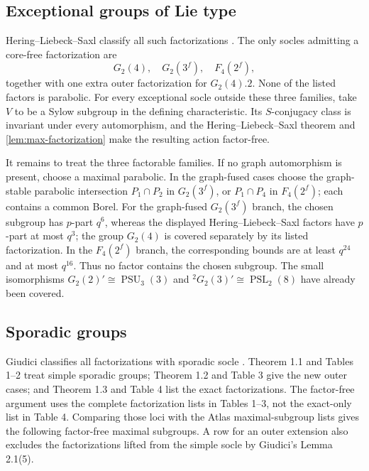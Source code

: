 \documentclass[11pt]{amsart}
\newcommand{\PSL}{\operatorname{PSL}}
\newcommand{\PSU}{\operatorname{PSU}}
\theoremstyle{definition}
\begin{document}
\subsection{Exceptional groups of Lie type}\label{app:exceptional}

Hering--Liebeck--Saxl classify all such factorizations
\cite[Theorems 1--2]{hls-exceptional}.
The only socles admitting a core-free factorization are
\[
G_2(4),\quad G_2(3^f),\quad F_4(2^f),
\]
together with one extra outer factorization for \(G_2(4).2\).  None of the
listed factors is parabolic.  For every exceptional socle outside these
three families, take \(V\) to be a Sylow subgroup in the defining
characteristic.  Its \(S\)-conjugacy class is invariant under every
automorphism, and the Hering--Liebeck--Saxl theorem and
\cref{lem:max-factorization} make the resulting action factor-free.

It remains to treat the three factorable families.  If no graph
automorphism is present, choose a maximal parabolic.  In the graph-fused
cases choose the graph-stable parabolic intersection \(P_1\cap P_2\) in
\(G_2(3^f)\), or \(P_1\cap P_4\) in \(F_4(2^f)\); each contains a common
Borel.  For the graph-fused \(G_2(3^f)\) branch, the chosen subgroup has
\(p\)-part \(q^6\), whereas the displayed Hering--Liebeck--Saxl factors have
\(p\)-part at most \(q^3\); the group \(G_2(4)\) is covered separately by
its listed factorization. In the \(F_4(2^f)\) branch, the corresponding bounds are at
least \(q^{24}\) and at most \(q^{16}\).  Thus no factor contains the
chosen subgroup.  The small isomorphisms \(G_2(2)'\cong\PSU_3(3)\) and
\({}^2G_2(3)'\cong\PSL_2(8)\) have already been covered.

\subsection{Sporadic groups}\label{app:sporadic}

Giudici classifies all factorizations with sporadic socle
\cite[Theorems 1.1--1.3 and Tables 1--4]{giudici}.  Theorem 1.1 and
Tables 1--2 treat simple sporadic groups; Theorem 1.2 and Table 3 give the
new outer cases; and Theorem 1.3 and Table 4 list the exact factorizations.
The factor-free argument uses the complete factorization lists in Tables 1--3,
not the exact-only list in Table 4.
Comparing those loci with the Atlas maximal-subgroup lists
\cite{atlas,atlas-online} gives the following factor-free maximal subgroups.
A row for an outer extension also excludes the factorizations lifted from
the simple socle by Giudici's Lemma 2.1(5).
\end{document}
